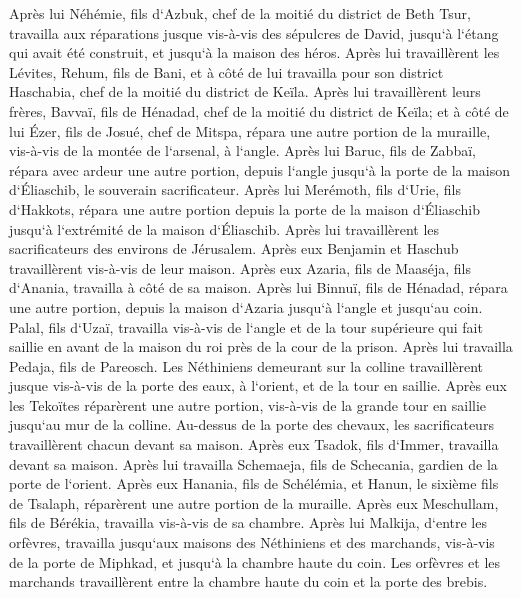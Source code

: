 \verse Après lui Néhémie, fils d`Azbuk, chef de la moitié du district de Beth Tsur, travailla aux réparations jusque vis-à-vis des sépulcres de David, jusqu`à l`étang qui avait été construit, et jusqu`à la maison des héros. 
\verse Après lui travaillèrent les Lévites, Rehum, fils de Bani, et à côté de lui travailla pour son district Haschabia, chef de la moitié du district de Keïla. 
\verse Après lui travaillèrent leurs frères, Bavvaï, fils de Hénadad, chef de la moitié du district de Keïla; 
\verse et à côté de lui Ézer, fils de Josué, chef de Mitspa, répara une autre portion de la muraille, vis-à-vis de la montée de l`arsenal, à l`angle. 
\verse Après lui Baruc, fils de Zabbaï, répara avec ardeur une autre portion, depuis l`angle jusqu`à la porte de la maison d`Éliaschib, le souverain sacrificateur. 
\verse Après lui Merémoth, fils d`Urie, fils d`Hakkots, répara une autre portion depuis la porte de la maison d`Éliaschib jusqu`à l`extrémité de la maison d`Éliaschib. 
\verse Après lui travaillèrent les sacrificateurs des environs de Jérusalem. 
\verse Après eux Benjamin et Haschub travaillèrent vis-à-vis de leur maison. Après eux Azaria, fils de Maaséja, fils d`Anania, travailla à côté de sa maison. 
\verse Après lui Binnuï, fils de Hénadad, répara une autre portion, depuis la maison d`Azaria jusqu`à l`angle et jusqu`au coin. 
\verse Palal, fils d`Uzaï, travailla vis-à-vis de l`angle et de la tour supérieure qui fait saillie en avant de la maison du roi près de la cour de la prison. Après lui travailla Pedaja, fils de Pareosch. 
\verse Les Néthiniens demeurant sur la colline travaillèrent jusque vis-à-vis de la porte des eaux, à l`orient, et de la tour en saillie. 
\verse Après eux les Tekoïtes réparèrent une autre portion, vis-à-vis de la grande tour en saillie jusqu`au mur de la colline. 
\verse Au-dessus de la porte des chevaux, les sacrificateurs travaillèrent chacun devant sa maison. 
\verse Après eux Tsadok, fils d`Immer, travailla devant sa maison. Après lui travailla Schemaeja, fils de Schecania, gardien de la porte de l`orient. 
\verse Après eux Hanania, fils de Schélémia, et Hanun, le sixième fils de Tsalaph, réparèrent une autre portion de la muraille. Après eux Meschullam, fils de Bérékia, travailla vis-à-vis de sa chambre. 
\verse Après lui Malkija, d`entre les orfèvres, travailla jusqu`aux maisons des Néthiniens et des marchands, vis-à-vis de la porte de Miphkad, et jusqu`à la chambre haute du coin. 
\verse Les orfèvres et les marchands travaillèrent entre la chambre haute du coin et la porte des brebis. 

